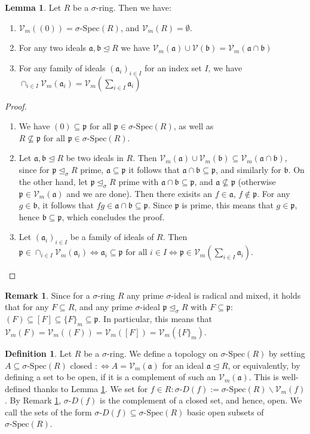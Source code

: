 \documentclass{article}
\def\Vm{\mathcal{V}_m}
\def\V{\mathcal{V}}
\def\a{\mathfrak{a}}
\def\b{\mathfrak{b}}
\def\p{\mathfrak{p}}
\def\s{\sigma}
\def\si{\unlhd_{\sigma}}
\def\sSpec{\sigma\text{-Spec}}
\def\fa{\text{ for all }}
\newenvironment{bew}{\begin{proof}[Proof]}{\end{proof}}
\theoremstyle{definition}
\newtheorem{rem}[Satz]{Remark}
\newtheorem{defn}[Satz]{Definition}
\newtheorem{lem}[Satz]{Lemma}
\begin{document}
\begin{lem}\label{topologywelldef}
Let $R$ be a $\s$-ring. Then we have:
\begin{enumerate}
\item $\Vm((0)) = \s$-Spec$(R)$, and $\Vm(R) = \emptyset$.
\item For any two ideals $\a,\b \unlhd R$ we have $\Vm(\a) \cup \V(\b) = \Vm(\a \cap \b)$
\item For any family of ideals $(\a_i)_{i \in I}$ for an index set $I$, we have $\cap_{i \in I} \Vm(\a_i) = \Vm(\sum_{i \in I} \a_i)$
\end{enumerate}
\begin{bew}
\begin{enumerate}
\item We have $(0) \subseteq \p \fa \p \in \sSpec(R)$, as well as $R \not\subseteq \p \fa \p \in \sSpec(R)$.
\item Let $\a, \b \unlhd R$ be two ideals in $R$. Then $\Vm(\a) \cup \Vm(\b) \subseteq \Vm(\a \cap \b)$, since for $\p \si R$ prime, $\a \subseteq \p$ it follows that $\a \cap \b \subseteq \p$, and similarly for $\b$.
On the other hand, let $\p \si R$ prime with $\a \cap \b \subseteq \p$, and $\a \not\subseteq \p$ (otherwise $\p \in \Vm(\a)$ and we are done). Then there exisits an $f \in \a$, $f \notin \p$. 
For any $g \in \b$, it follows that $fg \in \a \cap \b \subseteq \p$. Since $\p$ is prime, this means that $g \in \p$, hence $\b \subseteq \p$, which concludes the proof.
\item Let $(\a_i)_{i \in I}$ be a family  of ideals of $R$. Then $\p \in \cap_{i \in I} \Vm(\a_i) \Leftrightarrow \a_i \subseteq \p \fa i \in I \Leftrightarrow \p \in \Vm(\sum_{i \in I} \a_i)$.
\end{enumerate}
\end{bew}
\end{lem}


\begin{rem}\label{vmsequal}
Since for a $\s$-ring $R$ any prime $\s$-ideal is radical and mixed, it holds that for any $F \subseteq R$, and any prime $\s$-ideal $\p \si R$ with $F \subseteq \p$:
$(F) \subseteq [F] \subseteq \{ F \}_m \subseteq \p$. In particular, this means that $\Vm(F) = \Vm((F)) = \Vm([F]) = \Vm(\{F\}_m)$.
\end{rem}

\begin{defn}\label{deftop}
Let $R$ be a $\s$-ring. We define a topology on $\sSpec(R)$ by setting $A \subseteq \sSpec(R)$ closed $:\Leftrightarrow A = \Vm(\a)$ for an ideal $\a \unlhd R$, or equivalently,
 by defining a set to be open, if it is a complement of such an $\Vm(\a)$. This is well-defined thanks to Lemma \ref{topologywelldef}.
We set for $f \in R: \s$-$ D(f):= \sSpec(R) \backslash \Vm(f)$. By Remark \ref{vmsequal}, $\s$-$D(f)$ is the complement of a closed set, and hence, open. 
We call the sets of the form $\s$-$D(f) \subseteq \sSpec(R)$ basic open subsets of $\sSpec(R)$.
\end{defn}
\end{document}
